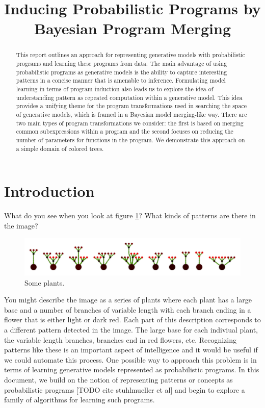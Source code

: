\documentclass[a4paper,10pt]{article}
\begin{document}
\title{Inducing Probabilistic Programs by Bayesian Program Merging}
\date{}
\maketitle
\begin{abstract}
This report outlines an approach for representing generative models with probabilistic programs and learning these programs from data.  The main advantage of using probabilistic programs as generative models is the ability to capture interesting patterns in a concise manner that is amenable to inference.  Formulating model learning in terms of program induction also leads us to explore the idea of understanding pattern as repeated computation within a generative model.  This idea provides a unifying theme for the program transformations used in searching the space of generative models, which is framed in a Bayesian model merging-like way.  There are two main types of program transformations we consider: the first is based on merging common subexpressions within a program and the second focuses on reducing the number of parameters for functions in the program.  We demonstrate this approach on a simple domain of colored trees.
\end{abstract}
\section{Introduction}
What do you see when you look at figure \ref{fig:plants}? What kinds of patterns are there in the image? 
\begin{figure}[h]
\begin{center}
\includegraphics[scale=.60]{plants.pdf}
\end{center}
\label{fig:plants}
\caption{Some plants.}
\end{figure}

You might describe the image as a series of plants where each plant has a large base and a number of branches of variable length with each branch ending in a flower that is either light or dark red.  Each part of this description corresponds to a different pattern detected in the image.  The large base for each indiviual plant, the variable length branches, branches end in red flowers, etc.  Recognizing patterns like these is an important aspect of intelligence and it would be useful if we could automate this process.  One possible way to approach this problem is in terms of learning generative models represented as probabilistic programs.  In this document, we build on the notion of representing patterns or concepts as probabilistic programs [TODO cite stuhlmueller et al] and begin to explore a family of algorithms for learning such programs.
\end{document}
